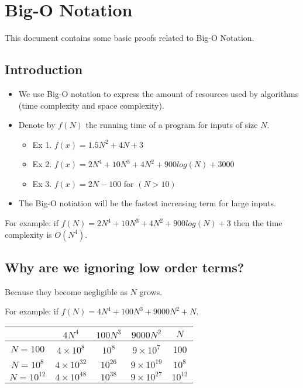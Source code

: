 \documentclass[12pt]{article}
\begin{document}
\section{Big-O Notation}

This document contains some basic proofs related to Big-O Notation.

\subsection{Introduction}

\begin{itemize}
\item We use Big-O notation to express the amount of resources used by algorithms (time complexity and space complexity).
\item Denote by $f(N)$ the running time of a program for inputs of size $N$.
\begin{itemize}
\item Ex 1. $f(x) = 1.5N^2 + 4N + 3$
\item Ex 2. $f(x) = 2N^4 + 10N^3 + 4N^2 + 900log(N) + 3000$
\item Ex 3. $f(x) = 2N - 100$ for $(N > 10)$
\end{itemize}
\item The Big-O notiation will be the fastest increasing term for large inputs.
\end{itemize}

For example: if $f(N) = 2N^4 + 10N^3 + 4N^2 + 900log(N) + 3$ then the time complexity is $O(N^4)$.

\subsection{Why are we ignoring low order terms?}

Because they become negligible as $N$ grows.

For example: if $f(N) = 4N^4 + 100N^3 + 9000N^2 + N$.

\begin{center}
\begin{tabular}{| c | c | c | c | c | }
\hline
& $4N^4$ & $100N^3$ & $9000N^2$ & $N$ \\ \hline
$N=100$ & $4 \times 10^8$ & $10^8$ & $9 \times 10^7$ & 100 \\ \hline
$N=10^8$ & $4 \times 10^{32}$ & $10^{26}$ & $9 \times 10^{19}$ & $10^8$ \\ \hline
$N=10^{12}$ & $4 \times 10^{48}$ & $10^{38}$ & $9 \times 10^{27}$ & $10^{12}$ \\ \hline
\end{tabular}
\end{center}
\end{document}
